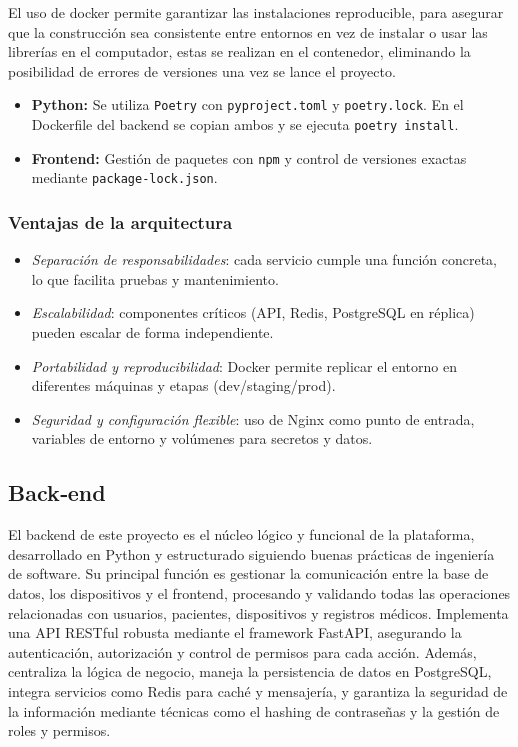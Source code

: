 \documentclass[12pt, a4paper]{article}
\begin{document}
El uso de docker permite garantizar las instalaciones reproducible, para asegurar que la construcción sea consistente entre entornos en vez de instalar o usar las librerías en el computador, estas se realizan en el contenedor, eliminando la posibilidad de errores de versiones una vez se lance el proyecto.

\begin{itemize}
	\item \textbf{Python:} Se utiliza \texttt{Poetry} con \texttt{pyproject.toml} y \texttt{poetry.lock}. En el Dockerfile del backend se copian ambos y se ejecuta \texttt{poetry install}.
	\item \textbf{Frontend:} Gestión de paquetes con \texttt{npm} y control de versiones exactas mediante \texttt{package-lock.json}.
\end{itemize}

\subsubsection{Ventajas de la arquitectura}
\begin{itemize}
	\item \emph{Separación de responsabilidades}: cada servicio cumple una función concreta, lo que facilita pruebas y mantenimiento.
	\item \emph{Escalabilidad}: componentes críticos (API, Redis, PostgreSQL en réplica) pueden escalar de forma independiente.
	\item \emph{Portabilidad y reproducibilidad}: Docker permite replicar el entorno en diferentes máquinas y etapas (dev/staging/prod).
	\item \emph{Seguridad y configuración flexible}: uso de Nginx como punto de entrada, variables de entorno y volúmenes para secretos y datos.
\end{itemize}





\subsection{Back‑end} 

El backend de este proyecto es el núcleo lógico y funcional de la plataforma, desarrollado en Python y estructurado siguiendo buenas prácticas de ingeniería de software. Su principal función es gestionar la comunicación entre la base de datos, los dispositivos y el frontend, procesando y validando todas las operaciones relacionadas con usuarios, pacientes, dispositivos y registros médicos. Implementa una API RESTful robusta mediante el framework FastAPI, asegurando la autenticación, autorización y control de permisos para cada acción. Además, centraliza la lógica de negocio, maneja la persistencia de datos en PostgreSQL, integra servicios como Redis para caché y mensajería, y garantiza la seguridad de la información mediante técnicas como el hashing de contraseñas y la gestión de roles y permisos.
\end{document}
